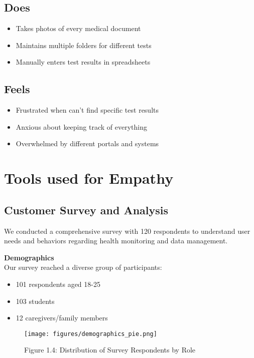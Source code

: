 \subsection{Does}
\begin{itemize}
    \item Takes photos of every medical document
    \item Maintains multiple folders for different tests
    \item Manually enters test results in spreadsheets
\end{itemize}

\subsection{Feels}
\begin{itemize}
    \item Frustrated when can't find specific test results
    \item Anxious about keeping track of everything
    \item Overwhelmed by different portals and systems
\end{itemize}

\section{Tools used for Empathy}
\subsection{Customer Survey and Analysis}
We conducted a comprehensive survey with 120 respondents to understand user needs and behaviors regarding health monitoring and data management.

\begin{minipage}{0.5\textwidth}
\textbf{Demographics}\\
Our survey reached a diverse group of participants:
\begin{itemize}
    \item 101 respondents aged 18-25
    \item 103 students
    \item 12 caregivers/family members
\end{itemize}
\end{minipage}
\begin{minipage}{0.5\textwidth}
\begin{figure}[H]
    \centering
    \texttt{[image: figures/demographics\_pie.png]}
    \caption{Figure 1.4: Distribution of Survey Respondents by Role}
\end{figure}
\end{minipage}

